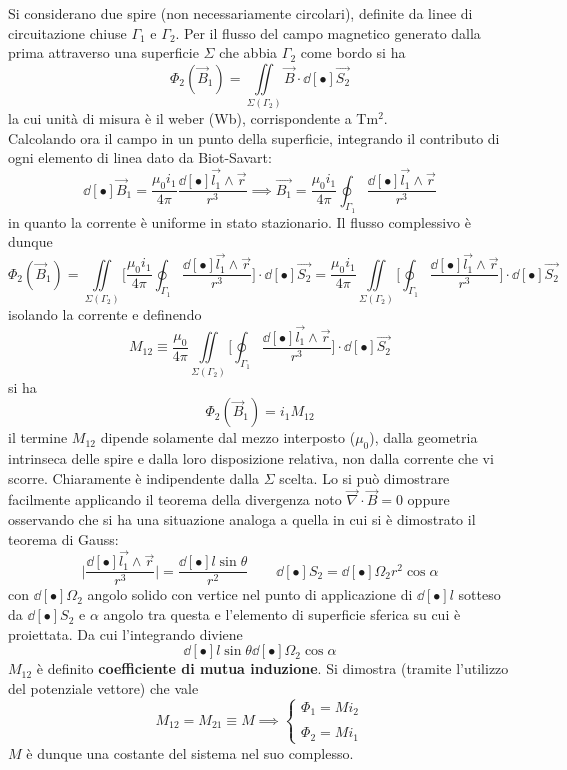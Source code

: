 Si considerano due spire (non necessariamente circolari), definite da linee di circuitazione chiuse $\Gamma_1$ e $\Gamma_2$. Per il flusso del campo magnetico generato dalla prima attraverso una superficie $\Sigma$ che abbia $\Gamma_2$ come bordo si ha
\[\Phi_2(\vec{B}_1) = \iint\limits_{\Sigma (\Gamma_2)} \vec{B} \cdot \dd[•]{\vec{S_2}} \]
la cui unità di misura è il weber (Wb), corrispondente a Tm${}^2$.
\\Calcolando ora il campo in un punto della superficie, integrando il contributo di ogni elemento di linea dato da Biot-Savart:
\[\dd[•]{\vec{B}_1} = \frac{\mu_0 i_1}{4 \pi} \frac{\dd[•]{\vec{l_1}} \wedge \vec{r}}{r^3} \implies \vec{B_1} = \frac{\mu_0 i_1}{4 \pi} \oint_{\Gamma_1} \frac{\dd[•]{\vec{l_1}} \wedge \vec{r}}{r^3}\]
in quanto la corrente è uniforme in stato stazionario. Il flusso complessivo è dunque
\[\Phi_2(\vec{B}_1) = \iint\limits_{\Sigma (\Gamma_2)} \bigg[\frac{\mu_0 i_1}{4 \pi} \oint_{\Gamma_1} \frac{\dd[•]{\vec{l_1}} \wedge \vec{r}}{r^3}\bigg] \cdot \dd[•]{\vec{S_2}} = \frac{\mu_0 i_1}{4 \pi} \iint\limits_{\Sigma (\Gamma_2)} \bigg[\oint_{\Gamma_1} \frac{\dd[•]{\vec{l_1}} \wedge \vec{r}}{r^3}\bigg] \cdot \dd[•]{\vec{S_2}} \]
isolando la corrente e definendo 
\[M_{12} \equiv \frac{\mu_0}{4 \pi} \iint\limits_{\Sigma (\Gamma_2)} \bigg[\oint_{\Gamma_1} \frac{\dd[•]{\vec{l_1}} \wedge \vec{r}}{r^3}\bigg] \cdot \dd[•]{\vec{S_2}}\]
si ha
\[\Phi_2(\vec{B}_1) = i_1 M_{12}\]
il termine $M_{12}$ dipende solamente dal mezzo interposto ($\mu_0$), dalla geometria intrinseca delle spire e dalla loro disposizione relativa, non dalla corrente che vi scorre. Chiaramente è indipendente dalla $\Sigma$ scelta. Lo si può dimostrare facilmente applicando il teorema della divergenza noto $\vec{\nabla} \cdot \vec{B} = 0$ oppure osservando che si ha una situazione analoga a quella in cui si è dimostrato il teorema di Gauss:
\[\big| \frac{\dd[•]{\vec{l_1}} \wedge \vec{r}}{r^3} \big| = \frac{\dd[•]{l} \sin \theta}{r^2} \qquad \dd[•]{S_2} = \dd[•]{\Omega_2} r^2 \cos \alpha\]
con $\dd[•]{\Omega_2}$ angolo solido con vertice nel punto di applicazione di $\dd[•]{l}$ sotteso da $\dd[•]{S_2}$ e $\alpha$ angolo tra questa e l'elemento di superficie sferica su cui è proiettata. Da cui l'integrando diviene
\[\dd[•]{l} \sin \theta \dd[•]{\Omega_2} \cos \alpha\]
$M_{12}$ è definito \textbf{coefficiente di mutua induzione}. Si dimostra (tramite l'utilizzo del potenziale vettore) che vale
\[M_{12} = M_{21} \equiv M \implies \begin{cases}
\Phi_1 = M i_2 \\ \\ \Phi_2 = M i_1
\end{cases}\]
$M$ è dunque una costante del sistema nel suo complesso.

